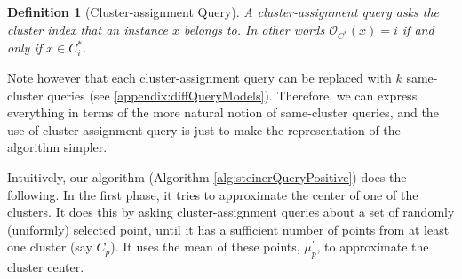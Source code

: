 \documentclass{article}
\newcommand{\mc}{\mathcal}
\newtheorem{definition}[theorem]{Definition}
\begin{document}
\begin{definition}[Cluster-assignment Query]
A cluster-assignment query asks the cluster index that an instance $x$ belongs to. In other words ${\mc O_{C^*}}(x) = i$ if and only if $x \in C^*_i$.
\end{definition}

Note however that each cluster-assignment query can be replaced with $k$ same-cluster queries (see \ref{appendix:diffQueryModels}). Therefore, we can express everything in terms of the more natural notion of same-cluster queries, and the use of cluster-assignment query is just to make the representation of the algorithm simpler.







Intuitively, our algorithm (Algorithm  \ref{alg:steinerQueryPositive}) does the following. In the first phase, it tries to approximate the center of one of the clusters. It does this by asking cluster-assignment queries about a set of randomly (uniformly) selected point, until it has a sufficient number of points from at least one cluster (say $C_p$). It uses the mean of these points, $\mu_p^\prime$, to approximate the cluster center. 
\end{document}
